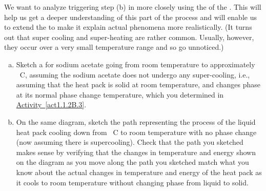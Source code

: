 \label{fnt1.1.3-3}

We want to analyze triggering step (b) in \hyperref[fnt1.1.3-2]{\thefnt} more closely using the \TempGraph{} of the \ThreePhaseModel{}. This will help us get a deeper understanding of this part of the process and will enable us to extend the \ThreePhaseModel{} to make it explain actual phenomena more realistically. (It turns out that super cooling and super-heating are rather common. Usually, however, they occur over a very small temperature range and so go unnoticed.)

\begin{enumerate}[(a)]
	\item Sketch a \TempGraph{} for sodium acetate going from room temperature to approximately \unit[150]{\textdegree C}, assuming the sodium acetate does not undergo any super-cooling, i.e., assuming that the heat pack is solid at room temperature, and changes phase at its normal phase change temperature, which you determined in \hyperref[act1.1.2]{Activity~\ref*{act1.1.2B.3}}.
	
	\item On the same diagram, sketch the path representing the process of the liquid heat pack cooling down from \unit[150]{\textdegree C} to room temperature with no phase change (now assuming there is supercooling). Check that the path you sketched makes sense by verifying that the changes in temperature and energy shown on the diagram as you move along the path you sketched match what you know about the actual changes in temperature and energy of the heat pack as it cools to room temperature without changing phase from liquid to solid.
\end{enumerate}